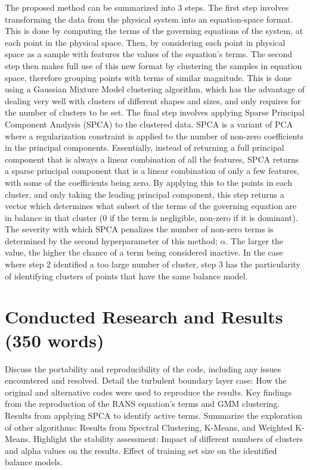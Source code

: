 \documentclass[12pt]{report} %
\begin{document}
The proposed method can be summarized into 3 steps. The first step involves transforming the data from the physical system into an equation-space format. This is done by computing the terms of the governing equations of the system, at each point in the physical space. Then, by considering each point in physical space as a sample with features the values of the equation's terms. The second step then makes full use of this new format by clustering the samples in equation space, therefore grouping points with terms of similar magnitude. This is done using a Gaussian Mixture Model clustering algorithm, which has the advantage of dealing very well with clusters of different shapes and sizes, and only requires for the number of clusters to be set. The final step involves applying Sparse Principal Component Analysis (SPCA) to the clustered data. SPCA is a variant of PCA where a regularization constraint is applied to the number of non-zero coefficients in the principal components. Essentially, instead of returning a full principal component that is always a linear combination of all the features, SPCA returns a sparse principal component that is a linear combination of only a few features, with some of the coefficients being zero. By applying this to the points in each cluster, and only taking the leading principal component, this step returns a vector which determines what subset of the terms of the governing equation are in balance in that cluster (0 if the term is negligible, non-zero if it is dominant). The severity with which SPCA penalizes the number of non-zero terms is determined by the second hyperparameter of this method; $\alpha$. The larger the value, the higher the chance of a term being considered inactive. In the case where step 2 identified a too large number of cluster, step 3 has the particularity of identifying clusters of points that have the same balance model.


\section{Conducted Research and Results (350 words)}

Discuss the portability and reproducibility of the code, including any issues encountered and resolved.
Detail the turbulent boundary layer case:
How the original and alternative codes were used to reproduce the results.
Key findings from the reproduction of the RANS equation’s terms and GMM clustering.
Results from applying SPCA to identify active terms.
Summarize the exploration of other algorithms:
Results from Spectral Clustering, K-Means, and Weighted K-Means.
Highlight the stability assessment:
Impact of different numbers of clusters and alpha values on the results.
Effect of training set size on the identified balance models.
\end{document}
